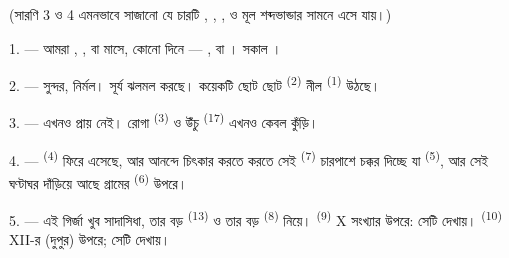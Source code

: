 %
%

\VUsaut{3.0mm}
\VUsaut{1.6mm}
\VUsaut{3.4mm}

(সারণি 3 ও 4 এমনভাবে সাজানো যে চারটি 
, , ,  ও
 মূল শব্দভান্ডার সামনে এসে যায়।)
\VUsaut{4.0mm}

\VUsaut{3.0mm}

\VUsaut{2.4mm}

\VUsaut{3.0mm}

1. --- আমরা , ,  বা
 মাসে,  কোনো দিনে --- ,
 বা । সকাল ।

2. ---  সুন্দর,  নির্মল। সূর্য ঝলমল করছে।
কয়েকটি ছোট ছোট  \textsuperscript{(2)} নীল 
\textsuperscript{(1)} উঠছে।

3. ---  এখনও প্রায়  নেই। রোগা 
\textsuperscript{(3)} ও উঁচু  \textsuperscript{(17)} এখনও কেবল
কুঁড়ি।

4. ---  \textsuperscript{(4)} ফিরে এসেছে, আর আনন্দে চিৎকার
করতে করতে সেই  \textsuperscript{(7)} চারপাশে চক্কর দিচ্ছে যা
 \textsuperscript{(5)}, আর সেই ঘণ্টাঘর দাঁড়িয়ে আছে গ্রামের
 \textsuperscript{(6)} উপরে।

\VUsaut{3.4mm}
\VUsaut{3.0mm}

5. --- এই গির্জা খুব সাদাসিধা, তার বড়  \textsuperscript{(13)} ও
তার বড়  \textsuperscript{(8)} নিয়ে। 
\textsuperscript{(9)} X সংখ্যার উপরে: সেটি  দেখায়।
 \textsuperscript{(10)} XII-র (দুপুর) উপরে; সেটি
 দেখায়।

